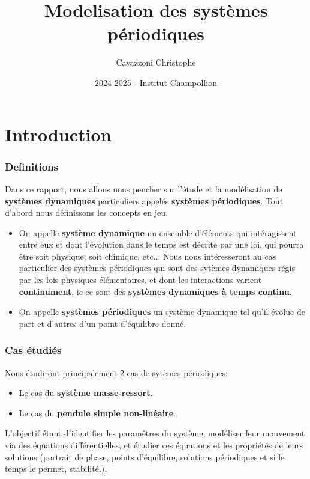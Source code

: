 \documentclass{report}
\title{Modelisation des systèmes périodiques}
\author{Cavazzoni Christophe}
\date{2024-2025 - Institut Champollion}
\begin{document}
   \maketitle
   \tableofcontents

   \chapter{Introduction}
      \subsection{Definitions}
         Dans ce rapport, nous allons nous pencher sur l'étude et la modélisation de \textbf{systèmes dynamiques} particuliers appelés \textbf{systèmes périodiques}. Tout d'abord nous définissons les concepts en jeu.

         \begin{itemize}
            \item On appelle \textbf{système dynamique} un ensemble d'éléments qui intéragissent entre eux et dont l'évolution dans le temps est décrite par une loi, qui pourra être soit physique, soit chimique, etc... Nous nous intéresseront au cas particulier des systèmes périodiques qui sont des sytèmes dynamiques régis par les lois physiques élémentaires, et dont les interactions varient \textbf{continument}, ie ce sont des \textbf{systèmes dynamiques à temps continu.}
            \item On appelle \textbf{systèmes périodiques} un système dynamique tel qu'il évolue de part et d'autres d'un point d'équilibre donné.
         \end{itemize}

      \subsection{Cas étudiés}
         Nous étudiront principalement 2 cas de sytèmes périodiques:
         \begin{itemize}
            \item Le cas du \textbf{système masse-ressort}.
            \item Le cas du \textbf{pendule simple non-linéaire}.
         \end{itemize}
         L'objectif étant d'identifier les paramêtres du système, modéliser leur mouvement via des équations différentielles, et étudier ces équations et les propriétés de leurs solutions (portrait de phase, points d'équilibre, solutions périodiques et si le temps le permet, stabilité.).
\end{document}
